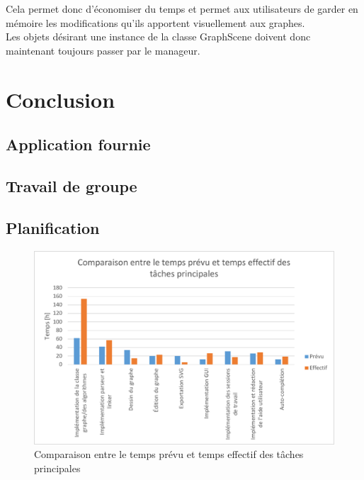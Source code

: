 \documentclass[french]{article}
\begin{document}
			Cela permet donc d'économiser du temps et permet aux utilisateurs de garder en mémoire les modifications qu'ils apportent visuellement aux graphes. \\
			
			Les objets désirant une instance de la classe GraphScene doivent donc maintenant toujours passer par le manageur.
			
	\section{Conclusion}
	
		\subsection{Application fournie}
		
		\subsection{Travail de groupe}
		
		\subsection{Planification}
		
			\begin{figure}[H]
				\includegraphics[width=\textwidth]{Planification/comparaisonheures.pdf}
				\caption{Comparaison entre le temps prévu et temps effectif des tâches
					principales}
				\label{fig:comparaisonheures}
			\end{figure}
			
\end{document}
